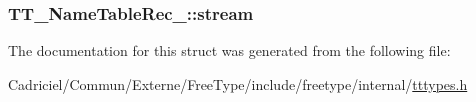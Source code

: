 \hypertarget{struct_t_t___name_table_rec___a97109aec8cd7ca13f6627f3fee15d48d}{
\subsubsection[{stream}]{ T\-T\-\_\-\-Name\-Table\-Rec\-\_\-\-::stream}}\label{struct_t_t___name_table_rec___a97109aec8cd7ca13f6627f3fee15d48d}


The documentation for this struct was generated from the following file\-:\begin{DoxyCompactItemize}
\item 
Cadriciel/\-Commun/\-Externe/\-Free\-Type/include/freetype/internal/\hyperlink{tttypes_8h}{tttypes.\-h}\end{DoxyCompactItemize}
